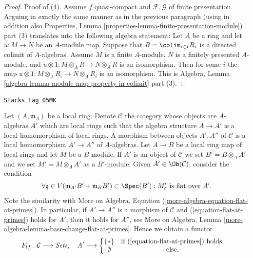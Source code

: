 \begin{proof}
\medskip\noindent
Proof of (4).
Assume $f$ quasi-compact and $\mathcal{F}, \mathcal{G}$ of finite presentation.
Arguing in exactly the same manner as in the previous paragraph
(using in addition also
Properties, Lemma \ref{properties-lemma-finite-presentation-module})
part (3) translates into the following algebra statement:
Let $A$ be a ring and let $u : M \to N$ be an $A$-module map.
Suppose that $R = \colim_{i \in I} R_i$ is a directed colimit
of $A$-algebras. Assume $M$ is a finite $A$-module, $N$ is a finitely
presented $A$-module, and
$u \otimes 1 : M \otimes_A R \to N \otimes_A R$ is an isomorphism.
Then for some $i$ the map
$u \otimes 1 : M \otimes_A R_i \to N \otimes_A R_i$ is an isomorphism.
This is
Algebra, Lemma \ref{algebra-lemma-module-map-property-in-colimit} part (3).
\end{proof}

\begin{definition}
\label{flat-situation-flat-at-point}
\href{https://stacks.math.columbia.edu/tag/05MK}{\texttt{Stacks tag 05MK}}

Let $(A, \mathfrak m_A)$ be a local ring.
Denote $\mathcal{C}$ the category whose objects are $A$-algebras
$A'$ which are local rings such that the algebra structure
$A \to A'$ is a local homomorphism of local rings.
A morphism between objects $A', A''$ of $\mathcal{C}$ is a
local homomorphism $A' \to A''$ of $A$-algebras.
Let $A \to B$ be a local ring map of local rings and let $M$ be a $B$-module.
If $A'$ is an object of $\mathcal{C}$ we set $B' = B \otimes_A A'$
and we set $M' = M \otimes_A A'$ as a $B'$-module.
Given $A' \in \Ob(\mathcal{C})$, consider the condition
\begin{equation}
\label{equation-flat-at-primes}
\forall \mathfrak q \in V(\mathfrak m_{A'}B' + \mathfrak m_B B')
\subset \Spec(B') :
M'_{\mathfrak q}\text{ is flat over }A'.
\end{equation}
Note the similarity with
More on Algebra, Equation (\ref{more-algebra-equation-flat-at-primes}).
In particular, if $A' \to A''$ is a morphism of $\mathcal{C}$ and
(\ref{equation-flat-at-primes}) holds for $A'$, then it holds for $A''$, see
More on Algebra,
Lemma \ref{more-algebra-lemma-base-change-flat-at-primes}.
Hence we obtain a functor
\begin{equation}
\label{equation-flat-at-point}
F_{lf} : \mathcal{C} \longrightarrow \textit{Sets}, \quad
A' \longrightarrow \left\{
\begin{matrix}
\{*\} & \text{if }(\ref{equation-flat-at-primes})\text{ holds}, \\
\emptyset & \text{else.} &
\end{matrix}
\right.
\end{equation}
\end{definition}


